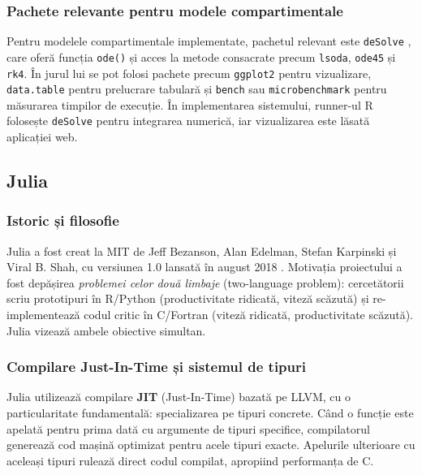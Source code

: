 \subsubsection{Pachete relevante pentru modele compartimentale}

Pentru modelele compartimentale implementate, pachetul relevant este \texttt{deSolve}
\cite{soetaert2010desolve}, care oferă funcția \texttt{ode()} și acces la metode
consacrate precum \texttt{lsoda}, \texttt{ode45} și \texttt{rk4}. În jurul lui se
pot folosi pachete precum \texttt{ggplot2} pentru vizualizare, \texttt{data.table}
pentru prelucrare tabulară și \texttt{bench} sau \texttt{microbenchmark} pentru
măsurarea timpilor de execuție. În implementarea sistemului, runner-ul R folosește
\texttt{deSolve} pentru integrarea numerică, iar vizualizarea este lăsată aplicației
web.

\subsection{Julia}
\label{subsec:julia}

\subsubsection{Istoric și filosofie}

Julia a fost creat la MIT de Jeff Bezanson, Alan Edelman, Stefan Karpinski
și Viral B. Shah, cu versiunea 1.0 lansată în august 2018 \cite{bezanson2017julia}.
Motivația proiectului a fost depășirea \emph{problemei celor două limbaje}
(two-language problem): cercetătorii scriu prototipuri în R/Python (productivitate
ridicată, viteză scăzută) și re-implementează codul critic în C/Fortran (viteză
ridicată, productivitate scăzută). Julia vizează ambele obiective simultan.

\subsubsection{Compilare Just-In-Time și sistemul de tipuri}

Julia utilizează compilare \textbf{JIT} (Just-In-Time) bazată pe LLVM, cu
o particularitate fundamentală: specializarea pe tipuri concrete. Când o funcție
este apelată pentru prima dată cu argumente de tipuri specifice, compilatorul
generează cod mașină optimizat pentru acele tipuri exacte. Apelurile ulterioare
cu aceleași tipuri rulează direct codul compilat, apropiind performanța de C.

